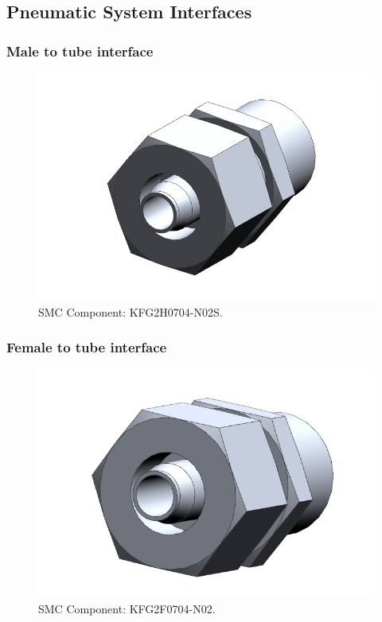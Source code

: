 \subsection{Pneumatic System Interfaces}
\label{sec:appP}



\subsubsection{Male to tube interface}


\begin{figure}[H]
    \centering
    \includegraphics[width=1\textwidth]{appendix/img/interfaces/Interface_Male_Tube.png}
    \caption{SMC Component: KFG2H0704-N02S.}
    \label{fig:male_interface}
\end{figure}


\subsubsection{Female to tube interface}

\begin{figure}[H]
    \centering
    \includegraphics[width=1\textwidth]{appendix/img/interfaces/Interface_Female_Tube.png}
    \caption{SMC Component: KFG2F0704-N02.}
    \label{fig:FEmale_interface}
\end{figure}




